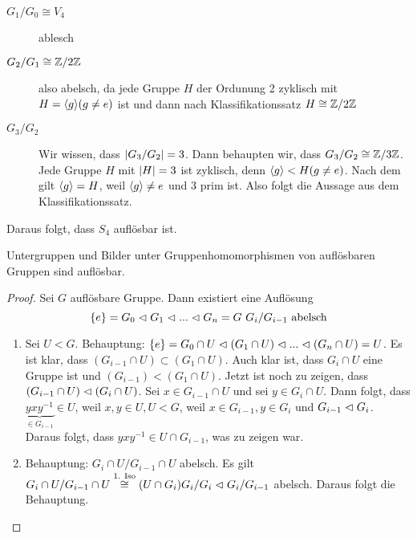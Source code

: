 \documentclass[12pt,a4paper]{scrartcl}
\begin{document}
\begin{bsp}
\begin{enumerate}
\begin{description}
			\item[$G_1/G_0 \cong V_4$] ablesch
			\item[$G_2/G_1 \cong \mathbb Z/2\mathbb Z$] also abelsch, da jede Gruppe $H$ der Ordunung 2 zyklisch mit $H = \langle g\rangle (g \neq e)$ ist und dann nach Klassifikationssatz $H \cong \mathbb Z/2\mathbb Z$
			\item[$G_3/G_2$] Wir wissen, dass $\lvert G_3/G_2\rvert = 3$. Dann behaupten wir, dass $G_3/G_2 \cong \mathbb Z/3\mathbb Z$. Jede Gruppe $H$ mit $\lvert H\rvert = 3$ ist zyklisch, denn $\langle g\rangle < H (g \neq e)$. Nach dem  gilt $\langle g\rangle = H$, weil $\langle g\rangle \neq e$ und 3 prim ist. Also folgt die Aussage aus dem Klassifikationssatz.
		\end{description}
		Daraus folgt, dass $S_4$ auflösbar ist.
	\end{enumerate}

	\begin{satz}
		Untergruppen und Bilder unter Gruppenhomomorphismen von auflösbaren Gruppen sind auflösbar.
	\end{satz}
	\begin{proof}
		Sei $G$ auflösbare Gruppe. Dann existiert eine Auflösung 
		\begin{equation*}
			\left\lbrace e\right\rbrace = G_0 \vartriangleleft G_1 \vartriangleleft ... \vartriangleleft G_n = G ~ G_i/G_{i-1} \text{ abelsch}
		\end{equation*}
		\begin{enumerate}
			\item Sei $U < G$. Behauptung: $\left\lbrace e\right\rbrace = G_0 \cap U \vartriangleleft (G_1 \cap U) \vartriangleleft ... \vartriangleleft (G_n \cap U) = U $. Es ist klar, dass $(G_{i-1} \cap U) \subset (G_1 \cap U)$. Auch klar ist, dass $G_i \cap U$ eine Gruppe ist und $(G_{i-1} ) < (G_1 \cap U)$. Jetzt ist noch zu zeigen, dass $(G_{i-1} \cap U) \vartriangleleft (G_i \cap U)$. Sei $x \in G_{i-1} \cap U$ und sei $y \in G_i \cap U$. Dann folgt, dass $\underbrace{yxy^{-1}}_{\in G_{i-1}} \in U$, weil $x, y \in U, U < G$, weil $x \in G_{i-1}, y \in G_i$ und $G_{i-1} \vartriangleleft G_i$. Daraus folgt, dass $yxy^{-1} \in U \cap G_{i-1}$, was zu zeigen war.
			\item Behauptung: $G_i \cap U / G_{i-1} \cap U$ abelsch. Es gilt $G_i \cap U / G_{i-1} \cap U \stackrel{\text{1. Iso}}{\cong} (U \cap G_i)G_i/G_i \vartriangleleft G_i/G_{i-1}$ abelsch. Daraus folgt die Behauptung.
		\end{enumerate}
	\end{proof}
\end{bsp}



\end{document}
